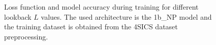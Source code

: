 \begin{figure}[!h]
    \caption{Loss function and model accuracy during training for different lookback $L$ values. The used architecture is the 1b\_NP model and the training dataset is obtained from the 4SICS dataset preprocessing.}
    \label{fig:res_lb_val}
\end{figure}

